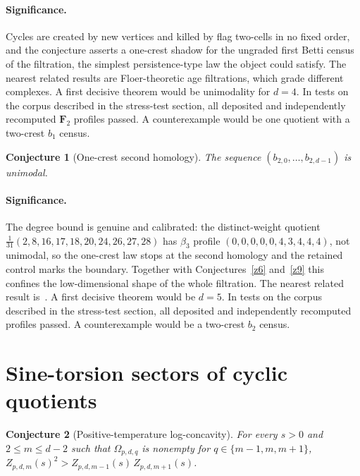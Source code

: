 \documentclass[11pt]{article}
\newtheorem{conjecture}{Conjecture}
\theoremstyle{definition}
\begin{document}
\paragraph{Significance.}
Cycles are created by new vertices and killed by flag two-cells in no fixed order, and the conjecture asserts a one-crest shadow for the ungraded first Betti census of the filtration, the simplest persistence-type law the object could satisfy.  The nearest related results are Floer-theoretic age filtrations, which grade different complexes.  A first decisive theorem would be unimodality for $d=4$.  In tests on the corpus described in the stress-test section, all deposited and independently recomputed $\mathbf F_2$ profiles passed.  A counterexample would be one quotient with a two-crest $b_1$ census.

\begin{conjecture}[One-crest second homology]\label{z10}
The sequence $(b_{2,0},\ldots,b_{2,d-1})$ is unimodal.
\end{conjecture}

\paragraph{Significance.}
The degree bound is genuine and calibrated: the distinct-weight quotient $\tfrac1{31}(2,8,16,17,18,20,24,26,27,28)$ has $\beta_3$ profile $(0,0,0,0,0,4,3,4,4,4)$, not unimodal, so the one-crest law stops at the second homology and the retained control marks the boundary.  Together with Conjectures~\ref{z6} and~\ref{z9} this confines the low-dimensional shape of the whole filtration.  The nearest related result is~\cite{Reid02}.  A first decisive theorem would be $d=5$.  In tests on the corpus described in the stress-test section, all deposited and independently recomputed profiles passed.  A counterexample would be a two-crest $b_2$ census.

\section{Sine-torsion sectors of cyclic quotients}

\begin{conjecture}[Positive-temperature log-concavity]\label{z11}
For every $s>0$ and $2\le m\le d-2$ such that $\Omega_{p,d,q}$ is nonempty for $q\in\{m-1,m,m+1\}$, $Z_{p,d,m}(s)^2>Z_{p,d,m-1}(s)\,Z_{p,d,m+1}(s)$.
\end{conjecture}
\end{document}
